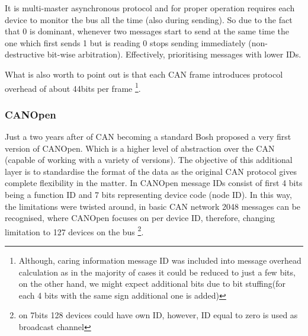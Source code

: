 It is multi-master asynchronous protocol and for proper operation requires each device to monitor the bus all the time (also during sending). So due to the fact that 0 is dominant, whenever two messages start to send at the same time the one which first sends 1 but is reading 0 stops sending immediately (non-destructive bit-wise arbitration). Effectively, prioritising messages with lower IDs.

What is also worth to point out is that each CAN frame introduces protocol overhead of about 44bits per frame \footnote{Although, caring information message ID was included into message overhead calculation as in the majority of cases it could be reduced to just a few bits, on the other hand, we might expect additional bits due to bit stuffing(for each 4 bits with the same sign additional one is added)\cite{CAN_stuffing}}.

\subsubsection{CANOpen} \label{can_subprotocol}
Just a two years after of CAN becoming a standard Bosh proposed a very first version of CANOpen.\cite{CANOpen_history}
Which is a higher level of abstraction over the CAN (capable of working with a variety of versions). The objective of this additional layer is to standardise the format of the data as the original CAN protocol gives complete flexibility in the matter. 
In CANOpen message IDs consist of first 4 bits being a function ID and 7 bits representing device code (node ID). In this way, the limitations were twisted around, in basic CAN network 2048 messages can be recognised, where CANOpen focuses on per device ID, therefore, changing limitation to 127 devices on the bus \footnote{on 7bits 128 devices could have own ID, however, ID equal to zero is used as broadcast channel}.

